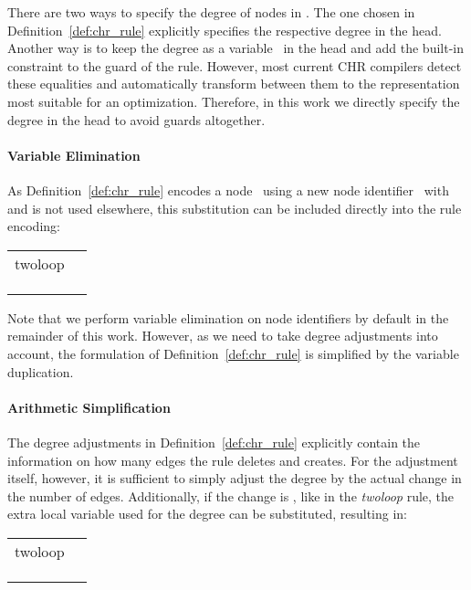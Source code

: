 \documentclass{tlp}
\begin{document}
There are two ways to specify the degree of nodes in . The one
chosen in Definition~\ref{def:chr_rule} explicitly specifies the respective
degree in the head. Another way is to keep the degree as a variable~ in the
head and add the built-in constraint  to the guard of the rule. However,
most current CHR compilers detect these equalities and automatically transform
between them to the representation most suitable for an optimization. Therefore,
in this work we directly specify the degree in the head to avoid guards
altogether.

\paragraph{Variable Elimination}

As Definition~\ref{def:chr_rule} encodes a node~ using a new node
identifier~ with  and  is not used elsewhere,
this substitution can be included directly into the rule encoding:

\begin{center} 
\begin{tabular}{ll} 
twoloop  & \\
& \\
& \\
& 
\end{tabular}
\end{center}

Note that we perform variable elimination on node identifiers by default in the
remainder of this work. However, as we need to take degree adjustments into
account, the formulation of Definition~\ref{def:chr_rule} is simplified by the
variable duplication.

\paragraph{Arithmetic Simplification}

The degree adjustments in Definition~\ref{def:chr_rule} explicitly contain the
information on how many edges the rule deletes and creates. For the adjustment
itself, however, it is sufficient to simply adjust the degree by the actual
change in the number of edges. Additionally, if the change is , like in the
\emph{twoloop} rule, the extra local variable used for the degree can be
substituted, resulting in:

\begin{center} 
\begin{tabular}{ll} 
twoloop  & \\
& \\
& \\
& 
\end{tabular}
\end{center}
\end{document}
